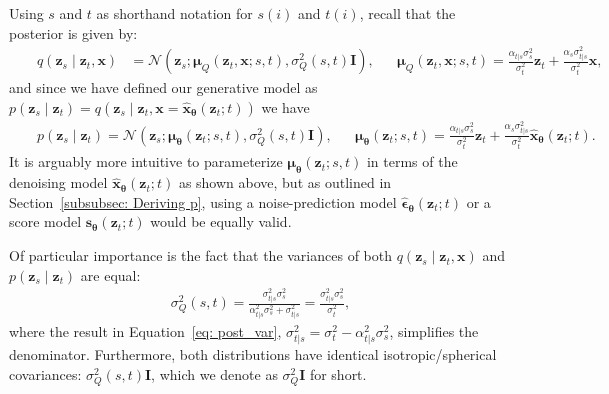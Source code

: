Using $s$ and $t$ as shorthand notation for $s(i)$ and $t(i)$, recall that the posterior is given by:
%
\begin{align}
    &&q(\mathbf{z}_s \mid \mathbf{z}_t, \mathbf{x}) & = \mathcal{N}\left(\mathbf{z}_s; \boldsymbol{\mu}_Q(\mathbf{z}_t, \mathbf{x};s,t), \sigma^2_Q(s,t) \mathbf{I}\right),
    && \boldsymbol{\mu}_Q(\mathbf{z}_t,\mathbf{x};s,t) = \frac{\alpha_{t|s}\sigma_s^2}{\sigma^2_{t}}\mathbf{z}_t + \frac{\alpha_s \sigma^2_{t|s}}{\sigma_{t}^2}\mathbf{x},&&
\end{align}
%
and since we have defined our generative model as $p(\mathbf{z}_s \mid \mathbf{z}_t) = q(\mathbf{z}_s \mid \mathbf{z}_t, \mathbf{x} = \hat{\mathbf{x}}_{\boldsymbol{\theta}}(\mathbf{z}_t;t))$ we have
%
\begin{align}
    && p(\mathbf{z}_s \mid \mathbf{z}_t) = \mathcal{N}\left(\mathbf{z}_s; \boldsymbol{\mu}_{\boldsymbol{\theta}}(\mathbf{z}_t;s,t), \sigma^2_Q(s,t)\mathbf{I}\right), && \boldsymbol{\mu}_{\boldsymbol{\theta}}(\mathbf{z}_t;s,t) = \frac{\alpha_{t|s}\sigma_s^2}{\sigma^2_{t}}\mathbf{z}_t + \frac{\alpha_s \sigma^2_{t|s}}{\sigma_{t}^2}\hat{\mathbf{x}}_{\boldsymbol{\theta}}(\mathbf{z}_t;t). &&
\end{align}
%
It is arguably more intuitive to parameterize $\boldsymbol{\mu}_{\boldsymbol{\theta}}(\mathbf{z}_t; s, t)$ in terms of the denoising model $\hat{\mathbf{x}}_{\boldsymbol{\theta}}(\mathbf{z}_t;t)$ as shown above, but as outlined in Section~\ref{subsubsec: Deriving p}, using a noise-prediction model $\hat{\boldsymbol{\epsilon}}_{\boldsymbol{\theta}}(\mathbf{z}_t;t)$ or a score model $\mathbf{s}_{\boldsymbol{\theta}}(\mathbf{z}_t;t)$ would be equally valid.

Of particular importance is the fact that the variances of both $q(\mathbf{z}_s \mid \mathbf{z}_t, \mathbf{x})$ and $p(\mathbf{z}_s \mid \mathbf{z}_t)$ are equal:
%
\begin{align}
    \sigma^2_Q(s,t) = \frac{\sigma_{t|s}^2\sigma_s^2}{\alpha_{t|s}^2 \sigma_s^2 + \sigma_{t|s}^2} = \frac{\sigma_{t|s}^2\sigma_s^2}{\sigma_t^2},
\end{align}
%
where the result in Equation~\ref{eq: post_var}, $\sigma_{t|s}^2 = \sigma^2_t - \alpha_{t|s}^2 \sigma_s^2$, simplifies the denominator. Furthermore, both distributions have identical isotropic/spherical covariances: $\sigma_Q^2(s,t)\mathbf{I}$, which we denote as $\sigma_Q^2\mathbf{I}$ for short. 

